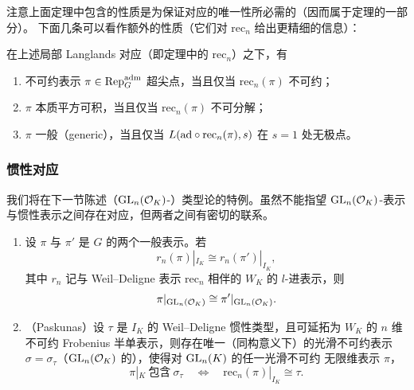注意上面定理中包含的性质是为保证对应的唯一性所必需的（因而属于定理的一部分）。
下面几条可以看作额外的性质（它们对 $\mathrm{rec}_n$ 给出更精细的信息）：

\begin{theorem}
在上述局部 Langlands 对应（即定理中的 $\mathrm{rec}_n$）之下，有
\begin{enumerate}[label=(\arabic*),leftmargin=2.2em]
\item 不可约表示 $\pi\in\mathrm{Rep}^{\mathrm{adm}}_G$ 超尖点，当且仅当 $\mathrm{rec}_n(\pi)$ 不可约；
\item $\pi$ 本质平方可积，当且仅当 $\mathrm{rec}_n(\pi)$ 不可分解；
\item $\pi$ 一般（generic），当且仅当 $L(\mathrm{ad}\circ\mathrm{rec}_n(\pi),s)$ 在 $s=1$ 处无极点。
\end{enumerate}
\end{theorem}

\subsubsection{惯性对应}

我们将在下一节陈述（$\mathrm{GL}_n(\mathcal{O}_K)$-）类型论的特例。虽然不能指望
$\mathrm{GL}_n(\mathcal{O}_K)$-表示与惯性表示之间存在对应，但两者之间有密切的联系。

\begin{proposition}
\leavevmode
\begin{enumerate}[label=(\arabic*),leftmargin=2.2em]
\item 设 $\pi$ 与 $\pi'$ 是 $G$ 的两个一般表示。若
\[
r_n(\pi)|_{I_K}\cong r_n(\pi')|_{I_K},
\]
其中 $r_n$ 记与 Weil--Deligne 表示 $\mathrm{rec}_n$ 相伴的 $W_K$ 的 $l$-进表示，则
\[
\pi|_{\mathrm{GL}_n(\mathcal{O}_K)}\cong\pi'|_{\mathrm{GL}_n(\mathcal{O}_K)}.
\]
\item （Paskunas）设 $\tau$ 是 $I_K$ 的 Weil--Deligne 惯性类型，且可延拓为 $W_K$ 的
      $n$ 维不可约 Frobenius 半单表示，则存在唯一（同构意义下）的光滑不可约表示
      $\sigma=\sigma_{\tau}$（$\mathrm{GL}_n(\mathcal{O}_K)$ 的），使得对 $\mathrm{GL}_n(K)$ 的任一光滑不可约
      无限维表示 $\pi$，
\[
\pi|_K\ \text{包含}\ \sigma_{\tau}
\quad\Longleftrightarrow\quad
\mathrm{rec}_n(\pi)|_{I_K}\cong\tau .
\]
\end{enumerate}
\end{proposition}

